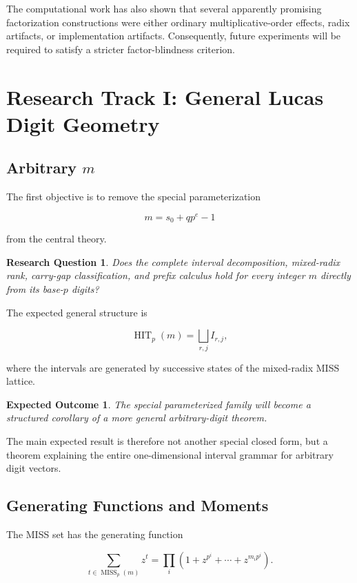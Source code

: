 \documentclass[11pt]{article}
\newtheorem{question}{Research Question}
\newtheorem{expectation}{Expected Outcome}
\begin{document}
The computational work has also shown that several apparently promising factorization constructions were either ordinary multiplicative-order effects, radix artifacts, or implementation artifacts. Consequently, future experiments will be required to satisfy a stricter factor-blindness criterion.

\section{Research Track I: General Lucas Digit Geometry}

\subsection{Arbitrary $m$}

The first objective is to remove the special parameterization

$$
m=s_0+qp^e-1
$$

from the central theory.

\begin{question}
Does the complete interval decomposition, mixed-radix rank, carry-gap classification, and prefix calculus hold for every integer $m$ directly from its base-$p$ digits?
\end{question}

The expected general structure is

$$
\operatorname{HIT}_p(m)
=
\bigsqcup_{r,j} I_{r,j},
$$

where the intervals are generated by successive states of the mixed-radix MISS lattice.

\begin{expectation}
The special parameterized family will become a structured corollary of a more general arbitrary-digit theorem.
\end{expectation}

The main expected result is therefore not another special closed form, but a theorem explaining the entire one-dimensional interval grammar for arbitrary digit vectors.

\subsection{Generating Functions and Moments}

The MISS set has the generating function

$$
\sum_{t\in\operatorname{MISS}_p(m)}z^t
=
\prod_i
\left(
1+z^{p^i}
+\cdots+
z^{m_ip^i}
\right).
$$
\end{document}
